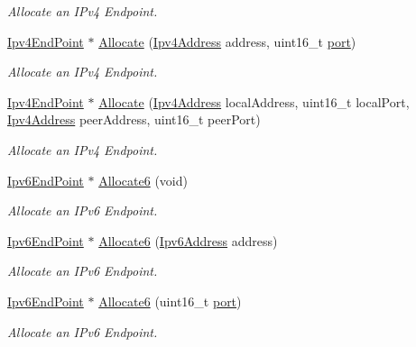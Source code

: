 \begin{DoxyCompactItemize}
\begin{DoxyCompactList}\small\item\em Allocate an I\+Pv4 Endpoint. \end{DoxyCompactList}\item 
\hyperlink{classns3_1_1Ipv4EndPoint}{Ipv4\+End\+Point} $\ast$ \hyperlink{classns3_1_1TcpL4Protocol_aefbec4064ad275ba7c75d49e672951c1}{Allocate} (\hyperlink{classns3_1_1Ipv4Address}{Ipv4\+Address} address, uint16\+\_\+t \hyperlink{visualizer-ideas_8txt_a21ff1c530daf8435e00048b7fc2c58e3}{port})
\begin{DoxyCompactList}\small\item\em Allocate an I\+Pv4 Endpoint. \end{DoxyCompactList}\item 
\hyperlink{classns3_1_1Ipv4EndPoint}{Ipv4\+End\+Point} $\ast$ \hyperlink{classns3_1_1TcpL4Protocol_a8db77eeebb3b4e6728137f8f0dfeb947}{Allocate} (\hyperlink{classns3_1_1Ipv4Address}{Ipv4\+Address} local\+Address, uint16\+\_\+t local\+Port, \hyperlink{classns3_1_1Ipv4Address}{Ipv4\+Address} peer\+Address, uint16\+\_\+t peer\+Port)
\begin{DoxyCompactList}\small\item\em Allocate an I\+Pv4 Endpoint. \end{DoxyCompactList}\item 
\hyperlink{classns3_1_1Ipv6EndPoint}{Ipv6\+End\+Point} $\ast$ \hyperlink{classns3_1_1TcpL4Protocol_ad893d914b5fa45d29bd5a66ab29e9b9b}{Allocate6} (void)
\begin{DoxyCompactList}\small\item\em Allocate an I\+Pv6 Endpoint. \end{DoxyCompactList}\item 
\hyperlink{classns3_1_1Ipv6EndPoint}{Ipv6\+End\+Point} $\ast$ \hyperlink{classns3_1_1TcpL4Protocol_aacb7472f9a2089f315e3163d81c9decc}{Allocate6} (\hyperlink{classns3_1_1Ipv6Address}{Ipv6\+Address} address)
\begin{DoxyCompactList}\small\item\em Allocate an I\+Pv6 Endpoint. \end{DoxyCompactList}\item 
\hyperlink{classns3_1_1Ipv6EndPoint}{Ipv6\+End\+Point} $\ast$ \hyperlink{classns3_1_1TcpL4Protocol_a39a60c2a0542afed9081e2bdf2b44e70}{Allocate6} (uint16\+\_\+t \hyperlink{visualizer-ideas_8txt_a21ff1c530daf8435e00048b7fc2c58e3}{port})
\begin{DoxyCompactList}\small\item\em Allocate an I\+Pv6 Endpoint. \end{DoxyCompactList}\item 

\end{DoxyCompactItemize}
